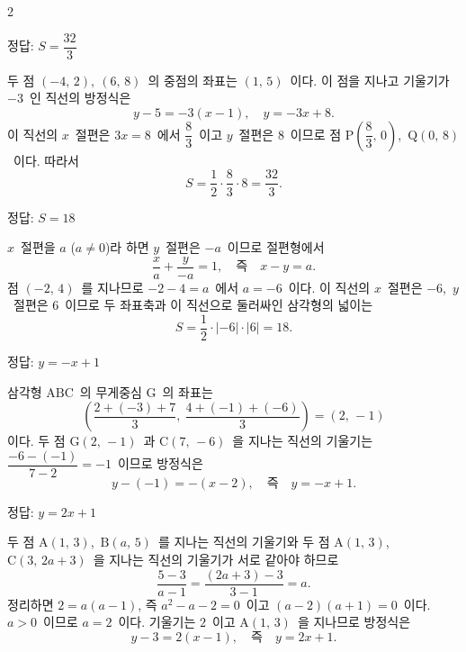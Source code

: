 \documentclass[10pt,fleqn]{article}
\begin{document}
\dmsoltitlefirsttrue
\begin{multicols*}{2}

\begin{dmanswerbox}
정답: $S=\dfrac{32}{3}$
\end{dmanswerbox}

두 점 $(-4,\, 2),\ (6,\, 8)$\ 의 중점의 좌표는 $(1,\, 5)$\ 이다. 이 점을 지나고 기울기가 $-3$\ 인 직선의 방정식은
\[ y - 5 = -3(x - 1),\quad y = -3x + 8. \]
이 직선의 $x$\ 절편은 $3x = 8$\ 에서 $\dfrac{8}{3}$\ 이고 $y$\ 절편은 $8$\ 이므로 점 $\mathrm{P}\!\left( \dfrac{8}{3},\, 0 \right)$,\ $\mathrm{Q}(0,\, 8)$\ 이다. 따라서
\[ S = \dfrac{1}{2} \cdot \dfrac{8}{3} \cdot 8 = \dfrac{32}{3}. \]

\begin{dmanswerbox}
정답: $S=18$
\end{dmanswerbox}

$x$\ 절편을 $a$ ($a \ne 0$)라 하면 $y$\ 절편은 $-a$\ 이므로 절편형에서
\[ \dfrac{x}{a} + \dfrac{y}{-a} = 1,\quad \text{즉}\quad x - y = a. \]
점 $(-2,\, 4)$\ 를 지나므로 $-2 - 4 = a$\ 에서 $a = -6$\ 이다. 이 직선의 $x$\ 절편은 $-6$,\ $y$\ 절편은 $6$\ 이므로 두 좌표축과 이 직선으로 둘러싸인 삼각형의 넓이는
\[ S = \dfrac{1}{2} \cdot |{-6}| \cdot |6| = 18. \]

\begin{dmanswerbox}
정답: $y=-x+1$
\end{dmanswerbox}

삼각형 $\mathrm{ABC}$\ 의 무게중심 $\mathrm{G}$\ 의 좌표는
\[ \left( \dfrac{2+(-3)+7}{3},\ \dfrac{4+(-1)+(-6)}{3} \right) = (2,\, -1) \]
이다. 두 점 $\mathrm{G}(2,\, -1)$\ 과 $\mathrm{C}(7,\, -6)$\ 을 지나는 직선의 기울기는 $\dfrac{-6-(-1)}{7-2} = -1$\ 이므로 방정식은
\[ y - (-1) = -(x - 2),\quad \text{즉}\quad y = -x + 1. \]

\begin{dmanswerbox}
정답: $y=2x+1$
\end{dmanswerbox}

두 점 $\mathrm{A}(1,\, 3)$,\ $\mathrm{B}(a,\, 5)$\ 를 지나는 직선의 기울기와 두 점 $\mathrm{A}(1,\, 3)$,\ $\mathrm{C}(3,\, 2a+3)$\ 을 지나는 직선의 기울기가 서로 같아야 하므로
\[ \dfrac{5-3}{a-1} = \dfrac{(2a+3)-3}{3-1} = a. \]
정리하면 $2 = a(a-1)$, 즉 $a^2 - a - 2 = 0$\ 이고 $(a-2)(a+1) = 0$\ 이다. $a > 0$\ 이므로 $a = 2$\ 이다. 기울기는 $2$\ 이고 $\mathrm{A}(1,\, 3)$\ 을 지나므로 방정식은
\[ y - 3 = 2(x - 1),\quad \text{즉}\quad y = 2x + 1. \]


\end{multicols*}
\end{document}
